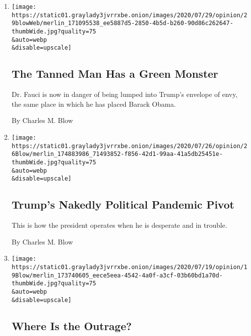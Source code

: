 \begin{enumerate}
\def\labelenumi{\arabic{enumi}.}
\item
  \href{/2020/07/29/opinion/anthony-fauci-trump.html}{}

  \texttt{[image: https://static01.graylady3jvrrxbe.onion/images/2020/07/29/opinion/29blowWeb/merlin\_171095538\_ee5887d5-2850-4b5d-b260-90d86c262647-thumbWide.jpg?quality=75\\\&auto=webp\\\&disable=upscale]}

  \hypertarget{the-tanned-man-has-a-green-monster}{%
  \subsection{The Tanned Man Has a Green
  Monster}\label{the-tanned-man-has-a-green-monster}}

  Dr. Fauci is now in danger of being lumped into Trump's envelope of
  envy, the same place in which he has placed Barack Obama.

  By Charles M. Blow
\item
  \href{/2020/07/26/opinion/trump-coronavirus-convention.html}{}

  \texttt{[image: https://static01.graylady3jvrrxbe.onion/images/2020/07/26/opinion/26Blow/merlin\_174883986\_71493852-f856-42d1-99aa-41a5db25451e-thumbWide.jpg?quality=75\\\&auto=webp\\\&disable=upscale]}

  \hypertarget{trumps-nakedly-political-pandemic-pivot}{%
  \subsection{Trump's Nakedly Political Pandemic
  Pivot}\label{trumps-nakedly-political-pandemic-pivot}}

  This is how the president operates when he is desperate and in
  trouble.

  By Charles M. Blow
\item
  \href{/2020/07/19/opinion/trump-coronavirus-us.html}{}

  \texttt{[image: https://static01.graylady3jvrrxbe.onion/images/2020/07/19/opinion/19Blow/merlin\_173740605\_eece5eea-4542-4a0f-a3cf-03b60bd1a70d-thumbWide.jpg?quality=75\\\&auto=webp\\\&disable=upscale]}

  \hypertarget{where-is-the-outrage}{%
  \subsection{Where Is the Outrage?}\label{where-is-the-outrage}}


\end{enumerate}
